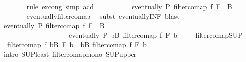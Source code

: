 \begin{isabellebody}
\ \ \ \ \ \ \isamarkupfalse%
\ {\isacharparenleft}{\kern0pt}rule\ ex{\isacharunderscore}{\kern0pt}cong{\isacharparenright}{\kern0pt}\ {\isacharparenleft}{\kern0pt}simp\ add{\isacharcolon}{\kern0pt}\ {\isacharasterisk}{\kern0pt}{\isacharparenright}{\kern0pt}\isanewline
\ \ \ \ \isamarkupfalse%
\ \isamarkupfalse%
\ {\isachardoublequoteopen}{\isasymdots}\ {\isasymlongleftrightarrow}\ eventually\ P\ {\isacharparenleft}{\kern0pt}filtercomap\ f\ {\isacharparenleft}{\kern0pt}{\isasymSqinter}{\isacharparenleft}{\kern0pt}F\ {\isacharbackquote}{\kern0pt}\ B{\isacharparenright}{\kern0pt}{\isacharparenright}{\kern0pt}{\isacharparenright}{\kern0pt}{\isachardoublequoteclose}\isanewline
\ \ \ \ \ \ \isamarkupfalse%
\ eventually{\isacharunderscore}{\kern0pt}filtercomap\ \isamarkupfalse%
\ {\isacharparenleft}{\kern0pt}subst\ eventually{\isacharunderscore}{\kern0pt}INF{\isacharparenright}{\kern0pt}\ blast\isanewline
\ \ \ \ \isamarkupfalse%
\ \isamarkupfalse%
\ {\isachardoublequoteopen}eventually\ P\ {\isacharparenleft}{\kern0pt}filtercomap\ f\ {\isacharparenleft}{\kern0pt}{\isasymSqinter}{\isacharparenleft}{\kern0pt}F\ {\isacharbackquote}{\kern0pt}\ B{\isacharparenright}{\kern0pt}{\isacharparenright}{\kern0pt}{\isacharparenright}{\kern0pt}\ {\isacharequal}{\kern0pt}\ \isanewline
\ \ \ \ \ \ \ \ \ \ \ \ \ \ \ \ \ \ \ \ eventually\ P\ {\isacharparenleft}{\kern0pt}{\isasymSqinter}b{\isasymin}B{\isachardot}{\kern0pt}\ filtercomap\ f\ {\isacharparenleft}{\kern0pt}F\ b{\isacharparenright}{\kern0pt}{\isacharparenright}{\kern0pt}{\isachardoublequoteclose}\ \isacommand{{\isachardot}{\kern0pt}{\isachardot}{\kern0pt}}\isamarkupfalse%
\isanewline
\ \ \isamarkupfalse%
\isanewline
{}\isamarkupfalse%
%
\endisatagproof
{\isafoldproof}%
%
\isadelimproof
\isanewline
%
\endisadelimproof
\isanewline
{}\isamarkupfalse%
\ filtercomap{\isacharunderscore}{\kern0pt}SUP{\isacharcolon}{\kern0pt}\isanewline
\ \ {\isachardoublequoteopen}filtercomap\ f\ {\isacharparenleft}{\kern0pt}{\isasymSqunion}b{\isasymin}B{\isachardot}{\kern0pt}\ F\ b{\isacharparenright}{\kern0pt}\ {\isasymge}\ {\isacharparenleft}{\kern0pt}{\isasymSqunion}b{\isasymin}B{\isachardot}{\kern0pt}\ filtercomap\ f\ {\isacharparenleft}{\kern0pt}F\ b{\isacharparenright}{\kern0pt}{\isacharparenright}{\kern0pt}{\isachardoublequoteclose}\isanewline
%
\isadelimproof
\ \ %
\endisadelimproof
%
\isatagproof
{}\isamarkupfalse%
\ {\isacharparenleft}{\kern0pt}intro\ SUP{\isacharunderscore}{\kern0pt}least\ filtercomap{\isacharunderscore}{\kern0pt}mono\ SUP{\isacharunderscore}{\kern0pt}upper{\isacharparenright}{\kern0pt}%

\end{isabellebody}
